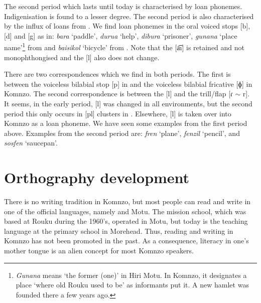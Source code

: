 The second period which lasts until today is characterised by loan phonemes. Indigenisation is found to a lesser degree. The second period is also characterised by the influx of loans from . We find loan phonemes in the oral voiced stops [b], [d] and [g] as in: \emph{bara} `paddle', \emph{durua} `help', \emph{dibura} `prisoner', \emph{gunana} `place name'\footnote{\emph{Gunana} means `the former (one)' in Hiri Motu. In Komnzo, it designates a place `where old Rouku used to be' as informants put it. A new hamlet was founded there a few years ago.} from  and \emph{baisikol} `bicycle' from . Note that the   [a͡ı] is retained and not monophthongised and the   [l] also does not change.%

There are two correspondences which we find in both periods. The first is between the voiceless bilabial stop [p] in  and the voiceless bilabial fricative [ɸ] in Komnzo. The second correspondence is between the   [l] and the  trill/flap [ɾ $\sim$ r]. It seems, in the early period, [l] was changed in all environments, but the second period this only occurs in [pl] clusters in . Elsewhere, [l] is taken over into Komnzo as a loan phoneme. We have seen some examples from the first period above. Examples from the second period are: \emph{fren} `plane', \emph{fenzil} `pencil', and \emph{sosfen} `saucepan'.

\section{Orthography development}\label{orthographydev}

There is no writing tradition in Komnzo, but most people can read and write in one of the official languages, namely  and Motu. The mission school, which was based at Rouku during the 1960's, operated in Motu, but today  is the teaching language at the primary school in Morehead. Thus, reading and writing in Komnzo has not been promoted in the past. As a consequence, literacy in one's mother tongue is an alien concept for most Komnzo speakers.%

